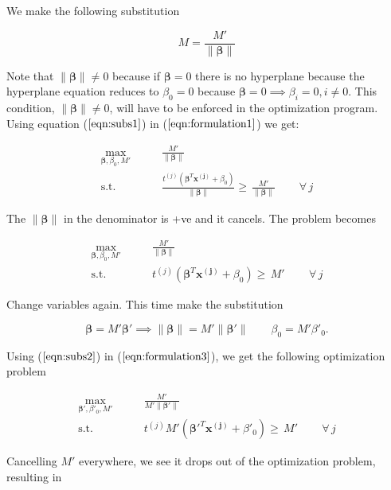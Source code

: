 \documentclass{article}
\newcommand{\beq}{\begin{equation}}
\newcommand{\eeq}{\end{equation}}
\begin{document}
We make the following substitution

\beq
\label{eqn:subs1}
M = \frac{M'}{\|\pmb{\beta}\|}
\eeq

Note that $\|\pmb{\beta}\|\ne{0}$ because if $\pmb{\beta}=0$ there is no hyperplane because the hyperplane equation reduces to $\beta_0=0$ because  $\pmb{\beta}=0 \implies {\beta_i}=0, i\ne{0}$. This condition, $\|\pmb{\beta}\|\ne{0}$, will have to be enforced in the optimization program.\\

Using equation ($\ref{eqn:subs1}$) in ($\ref{eqn:formulation1}$) we get:

\beq
\label{eqn:formulation2}
\begin{aligned}
  \max_{\pmb{\beta},\beta_0,M'} &  \qquad \frac{M'}{\|\pmb{\beta}\|} \\
  \textrm{s.t.} & \qquad \frac{t^{(j)}(\pmb{\beta}^T{\pmb{x^{(j)}}} + \beta_0)}{\|\pmb{\beta}\|} \ge\, \frac{M'}{\|\pmb{\beta}\|}  \, \qquad \forall \,{j}
\end{aligned}
\eeq

The $\|\pmb{\beta}\|$ in the denominator is +ve and it cancels. The problem becomes

\beq
\label{eqn:formulation3}
\begin{aligned}
  \max_{\pmb{\beta},\beta_0,M'} &  \qquad \frac{M'}{\|\pmb{\beta}\|} \\
  \textrm{s.t.} & \qquad {t^{(j)}(\pmb{\beta}^T{\pmb{x^{(j)}}} + \beta_0)} \ge\, {M'}  \, \qquad \forall \,{j}
\end{aligned}
\eeq

Change variables again. This time make the substitution

\beq
\label{eqn:subs2}
\pmb{\beta} = M'\pmb{\beta}' \implies \|\pmb{\beta}\| = M'\|\pmb{\beta}'\|    \qquad \beta_0 = M'\beta'_0. 
\eeq

Using ($\ref{eqn:subs2}$) in ($\ref{eqn:formulation3}$), we get the following optimization problem

\beq
\label{eqn:formulation4}
\begin{aligned}
  \max_{\pmb{\beta}',\beta'_0,M'} &  \qquad \frac{M'}{M'\|\pmb{\beta}'\|} \\
  \textrm{s.t.} & \qquad {t^{(j)}M'({\pmb{\beta}'}^T{\pmb{x^{(j)}}} + \beta'_0)} \ge\, {M'}  \, \qquad \forall \,{j}
\end{aligned}
\eeq

Cancelling $M'$ everywhere, we see it drops out of the optimization problem, resulting in
\end{document}
